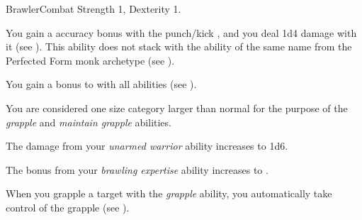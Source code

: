     \begin{feat}{Brawler}{Combat}
        \featpre Strength 1, Dexterity 1.

         You gain a  accuracy bonus with the punch/kick , and you deal 1d4 damage with it (see ).
        This ability does not stack with the ability of the same name from the Perfected Form monk archetype (see ).

         You gain a  bonus to  with all  abilities (see ).

         You are considered one size category larger than normal for the purpose of the \textit{grapple} and \textit{maintain grapple} abilities.

         The damage from your \textit{unarmed warrior} ability increases to 1d6.

         The bonus from your \textit{brawling expertise} ability increases to .

         When you grapple a target with the \textit{grapple} ability, you automatically take control of the grapple (see ).
    \end{feat}

